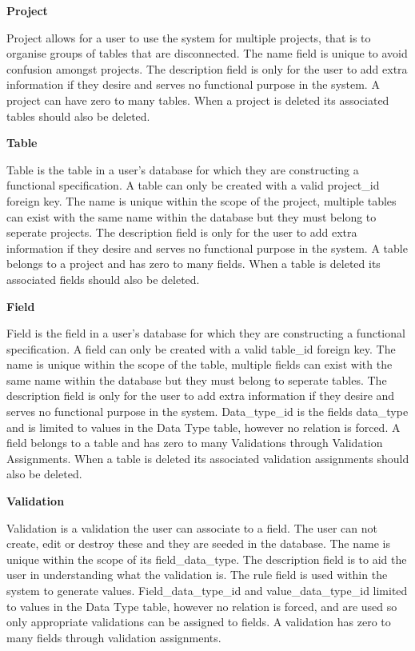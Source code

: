 \documentclass[a4paper,12pt]{article}
\begin{document}
\par \textbf{Project}
\par Project allows for a user to use the system for multiple projects, that is to organise groups of tables that are disconnected. The name field is unique to avoid confusion amongst projects. The description field is only for the user to add extra information if they desire and serves no functional purpose in the system. A project can have zero to many tables. When a project  is deleted its associated tables should also be deleted.

\par \textbf{Table}
\par Table is the table in a user's database for which they are constructing a functional specification. A table can only be created with a valid project\_id foreign key. The name is unique within the scope of the project, multiple tables can exist with the same name within the database but they must belong to seperate projects. The description field is only for the user to add extra information if they desire and serves no functional purpose in the system. A table belongs to a project and has zero to many fields. When a table is deleted its associated fields should also be deleted.

\par \textbf{Field}
\par Field is the field in a user's database for which they are constructing a functional specification. A field can only be created with a valid table\_id foreign key. The name is unique within the scope of the table, multiple fields can exist with the same name within the database but they must belong to seperate tables. The description field is only for the user to add extra information if they desire and serves no functional purpose in the system. Data\_type\_id is the fields data\_type and is limited to values in the Data Type table, however no relation is forced. A field belongs to a table and has zero to many Validations through Validation Assignments. When a table is deleted its associated validation assignments should also be deleted.

\par \textbf{Validation}
\par Validation is a validation the user can associate to a field. The user can not create, edit or destroy these and they are seeded in the database. The name is unique within the scope of its field\_data\_type. The description field is to aid the user in understanding what the validation is. The rule field is used within the system to generate values. Field\_data\_type\_id and value\_data\_type\_id limited to values in the Data Type table, however no relation is forced, and are used so only appropriate validations can be assigned to fields. A validation has zero to many fields through validation assignments.
\end{document}
